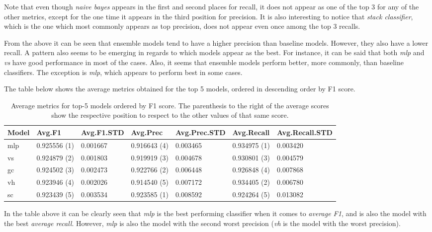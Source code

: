 \documentclass[epsfig,a4paper,11pt,titlepage,twoside,openany]{book}
\begin{document}
Note that even though \textit{naive bayes} appears in the first and second places for recall, it does not appear as one of the top 3 for any of the other metrics, except for the one time it appears in the third position for precision. It is also interesting to notice that \textit{stack classifier}, which is the one which most commonly appears as top precision, does not appear even once among the top 3 recalls.

From the above it can be seen that ensemble models tend to have a higher precision than baseline models. However, they also have a lower recall. A pattern also seems to be emerging in regards to which models appear as the best. For instance, it can be said that both \textit{mlp} and \textit{vs} have good performance in most of the cases. Also, it seems that ensemble models perform better, more commonly, than baseline classifiers. The exception is \textit{mlp}, which appears to perform best in some cases.

The table below shows the average metrics obtained for the top 5 models, ordered in descending order by F1 score. 

\begin{table}[H]
\centering
\begin{tabular}{l|l|l|l|l|l|l}
Model & Avg.F1       & Avg.F1.STD & Avg.Prec     & Avg.Prec.STD & Avg.Recall   & Avg.Recall.STD \\ \hline
mlp   & 0.925556 (1) & 0.001667   & 0.916643 (4) & 0.003465     & 0.934975 (1) & 0.003420       \\
vs    & 0.924879 (2) & 0.001803   & 0.919919 (3) & 0.004678     & 0.930801 (3) & 0.004579       \\
gc    & 0.924502 (3) & 0.002473   & 0.922766 (2) & 0.006448     & 0.926848 (4) & 0.007868       \\
vh    & 0.923946 (4) & 0.002026   & 0.914540 (5) & 0.007172     & 0.934405 (2) & 0.006780       \\
sc    & 0.923439 (5) & 0.003534   & 0.923585 (1) & 0.008592     & 0.924264 (5) & 0.013082      
\end{tabular}
\caption{Average metrics for top-5 models ordered by F1 score. The parenthesis to the right of the average scores show the respective position to respect to the other values of that same score. }
\label{tab:comparison-average-all-models}
\end{table}

In the table above it can be clearly seen that \textit{mlp} is the best performing classifier when it comes to \textit{average F1}, and is also the model with the best \textit{average recall}. However, \textit{mlp} is also the model with the second worst precision (\textit{vh} is the model with the worst precision). 
 
\end{document}
